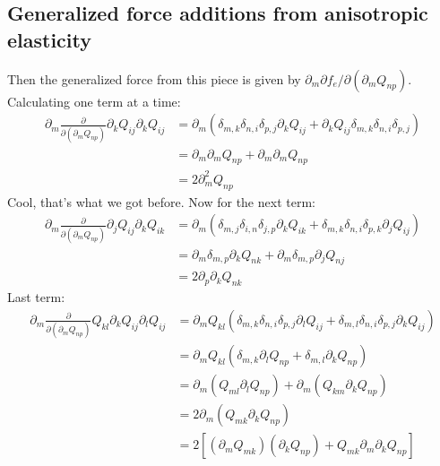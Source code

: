 \documentclass[reqno]{article}
\begin{document}
	\subsection{Generalized force additions from anisotropic elasticity}
	Then the generalized force from this piece is given by $\partial_m \partial f_e/\partial (\partial_m Q_{np})$. 
	Calculating one term at a time:
	\begin{equation}
	\begin{split}
		\partial_m \frac{\partial}{\partial (\partial_m Q_{np})}
		\partial_k Q_{ij} \partial_k Q_{ij} 
		&= \partial_m \left( 
		\delta_{m, k} \delta_{n, i} \delta_{p, j} \partial_k Q_{ij}
		+ \partial_k Q_{ij} \delta_{m, k} \delta_{n, i} \delta_{p, j}
		\right) \\
		&= \partial_m \partial_m Q_{np} + \partial_m \partial_m Q_{np} \\
		&= 2 \partial_m^2 Q_{np}
	\end{split}
	\end{equation}
	Cool, that's what we got before.
	Now for the next term:
	\begin{equation}
	\begin{split}
		\partial_m \frac{\partial}{\partial (\partial_m Q_{np})} 
		\partial_j Q_{ij} \partial_k Q_{ik}
		&= \partial_m \left(
		\delta_{m, j} \delta_{i, n} \delta_{j, p} \partial_k Q_{ik}
		+ \delta_{m, k} \delta_{n, i} \delta_{p, k} \partial_j Q_{ij}
		\right) \\
		&= \partial_m \delta_{m, p} \partial_k Q_{nk} + \partial_m \delta_{m, p} \partial_j Q_{nj} \\
		&= 2 \partial_p \partial_k Q_{nk}
	\end{split}
	\end{equation}
	Last term:
	\begin{equation}
	\begin{split}
		\partial_m \frac{\partial}{\partial (\partial_m Q_{np})} 
		Q_{kl} \partial_k Q_{ij} \partial_l Q_{ij}
		&= \partial_m Q_{kl} \left(
		\delta_{m, k} \delta_{n, i} \delta_{p, j} \partial_l Q_{ij}
		+ \delta_{m, l} \delta_{n, i} \delta_{p, j} \partial_k Q_{ij}
		\right) \\
		&= \partial_m Q_{kl} \left(
		\delta_{m, k} \partial_l Q_{np}
		+ \delta_{m, l} \partial_k Q_{np}
		\right) \\
		&= \partial_m \left( Q_{ml} \partial_l Q_{np} \right)
		+ \partial_m \left( Q_{km} \partial_k Q_{np} \right) \\
		&= 2 \partial_m \left( Q_{mk} \partial_k Q_{np} \right) \\
		&= 2 \left[
		\left(\partial_m Q_{mk} \right) \left( \partial_k Q_{np} \right)
		+ Q_{mk} \partial_m \partial_k Q_{np}
		\right]
	\end{split}
	\end{equation}
\end{document}

